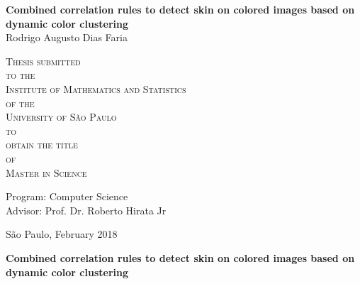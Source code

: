 \documentclass[11pt,twoside,a4paper]{book}
\theoremstyle{plain}
\theoremstyle{definition}
\begin{document}
\frontmatter 
\fancyhead[RO]{{\footnotesize\rightmark}\hspace{2em}\thepage}
\setcounter{tocdepth}{2}
\fancyhead[LE]{\thepage\hspace{2em}\footnotesize{\leftmark}}
\fancyhead[RE,LO]{}
\fancyhead[RO]{{\footnotesize\rightmark}\hspace{2em}\thepage}

\onehalfspacing  %

\thispagestyle{empty}
\begin{center}
    \vspace*{2.3cm}
    \textbf{\Large{Combined correlation rules to detect skin on colored images based on dynamic color clustering}}\\
    
    \vspace*{1.2cm}
    \Large{Rodrigo Augusto Dias Faria}
    
    \vskip 2cm
    \textsc{
    Thesis submitted\\[-0.25cm] 
    to the\\[-0.25cm]
    Institute of Mathematics and Statistics\\[-0.25cm]
    of the\\[-0.25cm]
    University of São Paulo\\[-0.25cm]
    to\\[-0.25cm]
    obtain the title\\[-0.25cm]
    of\\[-0.25cm]
    Master in Science}
    
    \vskip 1.5cm
    Program: Computer Science\\
    Advisor: Prof. Dr. Roberto Hirata Jr

    
    \vskip 1.5cm %
    \normalsize{São Paulo, February 2018}
\end{center}

%
%
%
\newpage
\thispagestyle{empty}
    \begin{center}
        \vspace*{2.3 cm}
        \textbf{\Large{Combined correlation rules to detect skin on colored images based on dynamic color clustering}}\\
        \vspace*{2 cm}
    \end{center}
\end{document}

